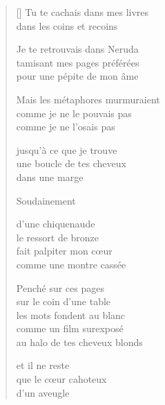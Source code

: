 \documentclass[12pt,a4paper]{article}
\begin{document}
\bigskip

\begin{verse}[\versewidth]
  Tu te cachais dans mes livres \\
  dans les coins et recoins

  Je te retrouvais dans Neruda \\
  tamisant mes pages préférées \\
  pour une pépite de mon âme

  Mais les métaphores murmuraient \\
  comme je ne le pouvais pas \\
  comme je ne l'osais pas

  jusqu'à ce que je trouve \\
  une boucle de tes cheveux \\
  dans une marge

  Soudainement

  d'une chiquenaude \\
  le ressort de bronze \\
  fait palpiter mon cœur \\
  comme une montre cassée

  Penché sur ces pages \\
  sur le coin d'une table \\
  les mots fondent au blanc \\
  comme un film surexposé \\
  au halo de tes cheveux blonds

  et il ne reste \\
  que le cœur cahoteux \\
  d'un aveugle
\end{verse}


\newpage

\poemtitle{}

\settowidth{\versewidth}{sur ton corps d'ambre lisse}

\bigskip
\end{document}

